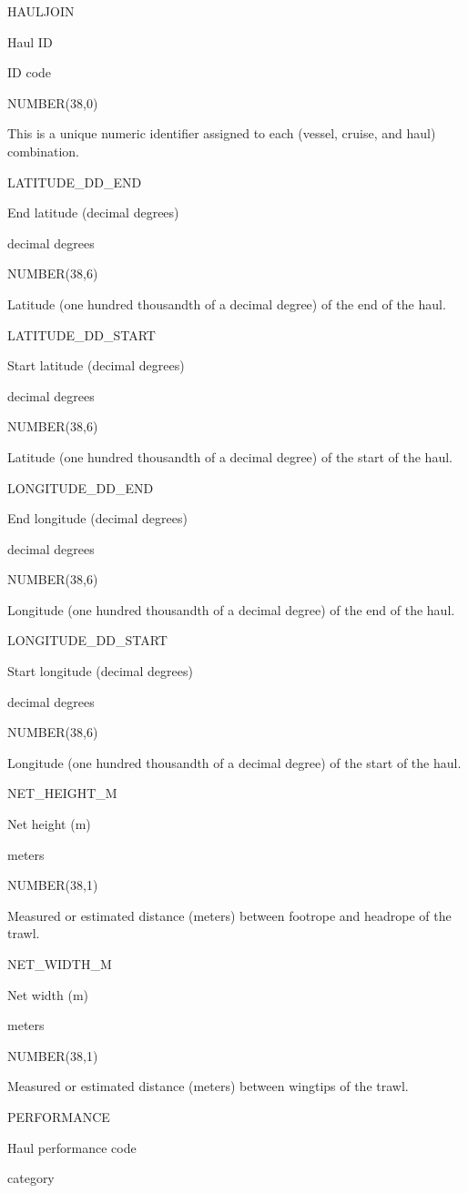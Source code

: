 \documentclass[
  letterpaper,
  oneside,
  open=any]{scrbook}
\begin{document}
HAULJOIN

Haul ID

ID code

NUMBER(38,0)

This is a unique numeric identifier assigned to each (vessel, cruise,
and haul) combination.

LATITUDE\_DD\_END

End latitude (decimal degrees)

decimal degrees

NUMBER(38,6)

Latitude (one hundred thousandth of a decimal degree) of the end of the
haul.

LATITUDE\_DD\_START

Start latitude (decimal degrees)

decimal degrees

NUMBER(38,6)

Latitude (one hundred thousandth of a decimal degree) of the start of
the haul.

LONGITUDE\_DD\_END

End longitude (decimal degrees)

decimal degrees

NUMBER(38,6)

Longitude (one hundred thousandth of a decimal degree) of the end of the
haul.

LONGITUDE\_DD\_START

Start longitude (decimal degrees)

decimal degrees

NUMBER(38,6)

Longitude (one hundred thousandth of a decimal degree) of the start of
the haul.

NET\_HEIGHT\_M

Net height (m)

meters

NUMBER(38,1)

Measured or estimated distance (meters) between footrope and headrope of
the trawl.

NET\_WIDTH\_M

Net width (m)

meters

NUMBER(38,1)

Measured or estimated distance (meters) between wingtips of the trawl.

PERFORMANCE

Haul performance code

category
\end{document}
